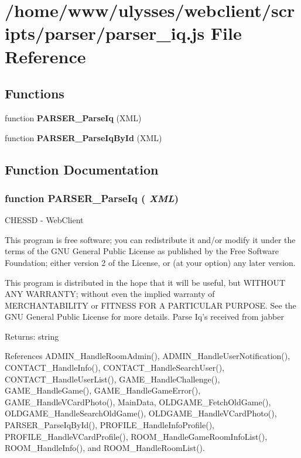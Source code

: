 \section{/home/www/ulysses/webclient/scripts/parser/parser\_\-iq.js File Reference}
\label{parser__iq_8js}
\subsection*{Functions}
\begin{CompactItemize}
\item 
function {\bf PARSER\_\-ParseIq} (XML)
\item 
function {\bf PARSER\_\-ParseIqById} (XML)
\end{CompactItemize}


\subsection{Function Documentation}
\subsubsection{\setlength{\rightskip}{0pt plus 5cm}function PARSER\_\-ParseIq ( {\em XML})}\label{parser__iq_8js_3a156ad4fae8f7ebe3f282b4c8d2ba01}


CHESSD - WebClient

This program is free software; you can redistribute it and/or modify it under the terms of the GNU General Public License as published by the Free Software Foundation; either version 2 of the License, or (at your option) any later version.

This program is distributed in the hope that it will be useful, but WITHOUT ANY WARRANTY; without even the implied warranty of MERCHANTABILITY or FITNESS FOR A PARTICULAR PURPOSE. See the GNU General Public License for more details. Parse Iq's received from jabber

\begin{Desc}
\item[Returns:]string \end{Desc}


References ADMIN\_\-HandleRoomAdmin(), ADMIN\_\-HandleUserNotification(), CONTACT\_\-HandleInfo(), CONTACT\_\-HandleSearchUser(), CONTACT\_\-HandleUserList(), GAME\_\-HandleChallenge(), GAME\_\-HandleGame(), GAME\_\-HandleGameError(), GAME\_\-HandleVCardPhoto(), MainData, OLDGAME\_\-FetchOldGame(), OLDGAME\_\-HandleSearchOldGame(), OLDGAME\_\-HandleVCardPhoto(), PARSER\_\-ParseIqById(), PROFILE\_\-HandleInfoProfile(), PROFILE\_\-HandleVCardProfile(), ROOM\_\-HandleGameRoomInfoList(), ROOM\_\-HandleInfo(), and ROOM\_\-HandleRoomList().

